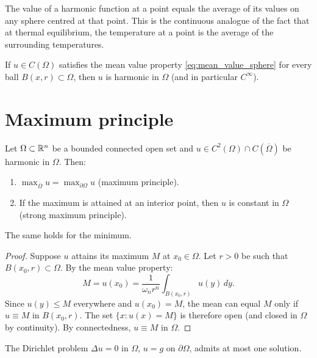 \begin{intuition}
The value of a harmonic function at a point equals the average of its
values on any sphere centred at that point. This is the continuous analogue
of the fact that at thermal equilibrium, the temperature at a point is
the average of the surrounding temperatures.
\end{intuition}

\begin{theorem}
If $u \in C(\Omega)$ satisfies the mean value property
\eqref{eq:mean_value_sphere} for every ball $B(x,r) \subset \Omega$,
then $u$ is harmonic in $\Omega$ (and in particular $C^\infty$).
\end{theorem}

\section{Maximum principle}

\begin{theorem}
\label{thm:strong_max_harmonic}
Let $\Omega \subset \mathbb{R}^n$ be a bounded connected open set and
$u \in C^2(\Omega) \cap C(\overline{\Omega})$ be harmonic in $\Omega$. Then:
\begin{enumerate}
    \item $\max_{\overline{\Omega}} u = \max_{\partial\Omega} u$
          (maximum principle).
    \item If the maximum is attained at an interior point, then $u$ is
          constant in $\Omega$ (strong maximum principle).
\end{enumerate}
The same holds for the minimum.
\end{theorem}

\begin{proof}
Suppose $u$ attains its maximum $M$ at $x_0 \in \Omega$. Let
$r > 0$ be such that $B(x_0, r) \subset \Omega$. By the mean value
property:
\[
    M = u(x_0) = \frac{1}{\omega_n r^n}\int_{B(x_0,r)} u(y)\, dy.
\]
Since $u(y) \leq M$ everywhere and $u(x_0) = M$, the mean can equal $M$
only if $u \equiv M$ in $B(x_0,r)$. The set $\{x : u(x) = M\}$ is
therefore open (and closed in $\Omega$ by continuity). By connectedness,
$u \equiv M$ in $\Omega$.
\end{proof}

\begin{corollary}
The Dirichlet problem $\Delta u = 0$ in $\Omega$, $u = g$ on
$\partial\Omega$, admits at most one solution.
\end{corollary}

